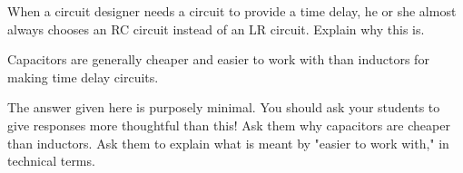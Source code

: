 

When a circuit designer needs a circuit to provide a time delay, he or she almost always chooses an RC circuit instead of an LR circuit.  Explain why this is.







Capacitors are generally cheaper and easier to work with than inductors for making time delay circuits.







The answer given here is purposely minimal.  You should ask your students to give responses more thoughtful than this!  Ask them why capacitors are cheaper than inductors.  Ask them to explain what is meant by "easier to work with," in technical terms.




